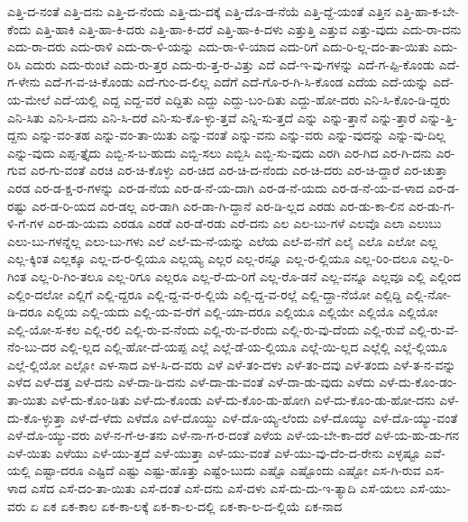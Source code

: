 {ಎತ್ತಿ-ದ-ನಂತೆ
ಎತ್ತಿ-ದನು
ಎತ್ತಿ-ದ-ನೆಂದು
ಎತ್ತಿ-ದು-ದಕ್ಕೆ
ಎತ್ತಿ-ದೊ-ಡ-ನೆಯೆ
ಎತ್ತಿ-ದ್ದೆ-ಯಂತೆ
ಎತ್ತಿನ
ಎತ್ತಿ-ಹಾ-ಕ-ಬೇ-ಕೆಂದು
ಎತ್ತಿ-ಹಾಕಿ
ಎತ್ತಿ-ಹಾ-ಕಿ-ದರು
ಎತ್ತಿ-ಹಾ-ಕಿ-ದರೆ
ಎತ್ತಿ-ಹಾ-ಕಿ-ದಳು
ಎತ್ತುತ್ತಿ
ಎತ್ತುವ
ಎತ್ತು-ವುದು
ಎದು-ರಾ-ದನು
ಎದು-ರಾ-ದರು
ಎದು-ರಾಳಿ
ಎದು-ರಾ-ಳಿ-ಯನ್ನು
ಎದು-ರಾ-ಳಿ-ಯಾದ
ಎದು-ರಿಗೆ
ಎದು-ರಿ-ಲ್ಲ-ದಂ-ತಾ-ಯಿತು
ಎದು-ರಿಸಿ
ಎದುರು
ಎದು-ರುಂಟೆ
ಎದು-ರು-ತ್ತರ
ಎದು-ರು-ತ್ತ-ರ-ವಿತ್ತು
ಎದೆ
ಎದೆ-ಇ-ವು-ಗಳನ್ನು
ಎದೆ-ಗ-ಪ್ಪಿ-ಕೊಂಡು
ಎದೆ-ಗ-ಳೇನು
ಎದೆ-ಗ-ವ-ಚಿ-ಕೊಂಡು
ಎದೆ-ಗುಂ-ದ-ಲಿಲ್ಲ
ಎದೆಗೆ
ಎದೆ-ಗೊ-ರ-ಗಿ-ಸಿ-ಕೊಂಡ
ಎದೆಯ
ಎದೆ-ಯನ್ನು
ಎದೆ-ಯ-ಮೇಲೆ
ಎದೆ-ಯಲ್ಲಿ
ಎದ್ದ
ಎದ್ದ-ವರೆ
ಎದ್ದಿತು
ಎದ್ದು
ಎದ್ದು-ಬಂ-ದಿತು
ಎದ್ದು-ಹೋ-ದರು
ಎನಿ-ಸಿ-ಕೊಂ-ಡಿ-ದ್ದರು
ಎನಿ-ಸಿತು
ಎನಿ-ಸಿ-ದನು
ಎನಿ-ಸಿ-ದರೆ
ಎನಿ-ಸು-ಕೊ-ಳ್ಳು-ತ್ತವೆ
ಎನ್ನಿ-ಸು-ತ್ತದೆ
ಎನ್ನು
ಎನ್ನು-ತ್ತಾನೆ
ಎನ್ನು-ತ್ತಾರೆ
ಎನ್ನು-ತ್ತಿ-ದ್ದನು
ಎನ್ನು-ವಂ-ತಹ
ಎನ್ನು-ವಂ-ತಾ-ಯಿತು
ಎನ್ನು-ವಂತೆ
ಎನ್ನು-ವನು
ಎನ್ನು-ವರು
ಎನ್ನು-ವುದನ್ನು
ಎನ್ನು-ವು-ದಿಲ್ಲ
ಎನ್ನು-ವುದು
ಎಪ್ಪ-ತ್ತೈದು
ಎಬ್ಬಿ-ಸ-ಬ-ಹುದು
ಎಬ್ಬಿ-ಸಲು
ಎಬ್ಬಿಸಿ
ಎಬ್ಬಿ-ಸು-ವುದು
ಎರಗಿ
ಎರ-ಗಿದ
ಎರ-ಗಿ-ದನು
ಎರ-ಗುವ
ಎರ-ಗು-ವಂತೆ
ಎರಚಿ
ಎರ-ಚಿ-ಕೊಳ್ಳು
ಎರ-ಚಿದ
ಎರ-ಚಿ-ದ-ನೆಂದು
ಎರ-ಚಿ-ದರು
ಎರ-ಚಿ-ದ್ದಾರೆ
ಎರ-ಚುತ್ತಾ
ಎರಡ
ಎರ-ಡ-ಕ್ಷ-ರ-ಗಳನ್ನು
ಎರ-ಡ-ನೆಯ
ಎರ-ಡ-ನೆ-ಯ-ದಾಗಿ
ಎರ-ಡ-ನೆ-ಯದು
ಎರ-ಡ-ನೆ-ಯ-ವ-ಳಾದ
ಎರ-ಡ-ರಷ್ಟು
ಎರ-ಡ-ರಿ-ಯದ
ಎರ-ಡಲ್ಲ
ಎರ-ಡಾಗಿ
ಎರ-ಡಾ-ಗಿ-ದ್ದಾನೆ
ಎರ-ಡಿ-ಲ್ಲದ
ಎರಡು
ಎರ-ಡು-ಕಾ-ಲಿನ
ಎರ-ಡು-ಗ-ಳಿ-ಗೆ-ಗಳ
ಎರ-ಡು-ಯಮ
ಎರಡೂ
ಎರಡೆ
ಎರ-ಡೆ-ರಡು
ಎರೆ-ದನು
ಎಲ
ಎಲ-ಬು-ಗಳೆ
ಎಲವೊ
ಎಲಾ
ಎಲುಬು
ಎಲು-ಬು-ಗಳನ್ನೆಲ್ಲ
ಎಲು-ಬು-ಗಳು
ಎಲೆ
ಎಲೆ-ಮ-ನೆ-ಯನ್ನು
ಎಲೆಯ
ಎಲೆ-ವ-ನೆಗೆ
ಎಲೈ
ಎಲೊ
ಎಲೋ
ಎಲ್ಲ
ಎಲ್ಲ-ಕ್ಕಿಂತ
ಎಲ್ಲಕ್ಕೂ
ಎಲ್ಲ-ದ-ರ-ಲ್ಲಿಯೂ
ಎಲ್ಲಯ್ಯ
ಎಲ್ಲರ
ಎಲ್ಲ-ರನ್ನೂ
ಎಲ್ಲ-ರ-ಲ್ಲಿಯೂ
ಎಲ್ಲ-ರಿಂ-ದಲೂ
ಎಲ್ಲ-ರಿ-ಗಿಂತ
ಎಲ್ಲ-ರಿ-ಗಿಂ-ತಲೂ
ಎಲ್ಲ-ರಿಗೂ
ಎಲ್ಲರೂ
ಎಲ್ಲ-ರೆ-ದು-ರಿಗೆ
ಎಲ್ಲ-ರೊ-ಡನೆ
ಎಲ್ಲ-ವನ್ನೂ
ಎಲ್ಲವೂ
ಎಲ್ಲಿ
ಎಲ್ಲಿಂದ
ಎಲ್ಲಿಂ-ದಲೋ
ಎಲ್ಲಿಗೆ
ಎಲ್ಲಿ-ದ್ದರೂ
ಎಲ್ಲಿ-ದ್ದ-ವ-ರ-ಲ್ಲಿಯೆ
ಎಲ್ಲಿ-ದ್ದ-ವ-ರಲ್ಲೆ
ಎಲ್ಲಿ-ದ್ದಾ-ನೆಯೋ
ಎಲ್ಲಿದ್ದಿ
ಎಲ್ಲಿ-ನೋ-ಡಿ-ದರೂ
ಎಲ್ಲಿಯ
ಎಲ್ಲಿ-ಯದು
ಎಲ್ಲಿ-ಯ-ವ-ರೆಗೆ
ಎಲ್ಲಿ-ಯಾ-ದರೂ
ಎಲ್ಲಿಯೂ
ಎಲ್ಲಿಯೇ
ಎಲ್ಲಿಯೊ
ಎಲ್ಲಿಯೋ
ಎಲ್ಲಿ-ಯೋ-ಸ-ಕಲ
ಎಲ್ಲಿ-ರಲಿ
ಎಲ್ಲಿ-ರು-ವ-ನೆಂದು
ಎಲ್ಲಿ-ರು-ವ-ರೆಂದು
ಎಲ್ಲಿ-ರು-ವು-ದೆಂದು
ಎಲ್ಲಿ-ರುವೆ
ಎಲ್ಲಿ-ರು-ವೆ-ನೆಂ-ಬು-ದರ
ಎಲ್ಲಿ-ಲ್ಲದ
ಎಲ್ಲಿ-ಹೋ-ದೆ-ಯಪ್ಪ
ಎಲ್ಲೆ
ಎಲ್ಲೆ-ಡೆ-ಯ-ಲ್ಲಿಯೂ
ಎಲ್ಲೆ-ಯಿ-ಲ್ಲದ
ಎಲ್ಲೆಲ್ಲಿ
ಎಲ್ಲೆ-ಲ್ಲಿಯೂ
ಎಲ್ಲೆ-ಲ್ಲಿಯೋ
ಎಲ್ಲೋ
ಎಳ-ಸಾದ
ಎಳ-ಸಿ-ದ-ವರು
ಎಳೆ
ಎಳೆ-ತಂ-ದಳು
ಎಳೆ-ತಂ-ದವು
ಎಳೆ-ತಂದು
ಎಳೆ-ತ-ನ-ವನ್ನು
ಎಳೆದ
ಎಳೆ-ದತ್ತ
ಎಳೆ-ದನು
ಎಳೆ-ದಾ-ಡಿ-ದನು
ಎಳೆ-ದಾ-ಡು-ವಂತೆ
ಎಳೆ-ದಾ-ಡು-ವುದು
ಎಳೆದು
ಎಳೆ-ದು-ಕೊಂ-ಡಂ-ತಾ-ಯಿತು
ಎಳೆ-ದು-ಕೊಂ-ಡಿತು
ಎಳೆ-ದು-ಕೊಂಡು
ಎಳೆ-ದು-ಕೊಂ-ಡು-ಹೋಗಿ
ಎಳೆ-ದು-ಕೊಂ-ಡು-ಹೋ-ದನು
ಎಳೆ-ದು-ಕೊ-ಳ್ಳುತ್ತಾ
ಎಳೆ-ದೆ-ಳೆದು
ಎಳೆದೊ
ಎಳೆ-ದೊಯ್ದು
ಎಳೆ-ದೊ-ಯ್ಯ-ಲೆಂದು
ಎಳೆ-ದೊಯ್ಯು
ಎಳೆ-ದೊ-ಯ್ಯು-ವಂತೆ
ಎಳೆ-ದೊ-ಯ್ಯು-ವರು
ಎಳೆ-ನ-ಗೆ-ಆ-ತನು
ಎಳೆ-ನಾ-ಗ-ರ-ದಂತೆ
ಎಳೆಯ
ಎಳೆ-ಯ-ಬೇ-ಕಾ-ದರೆ
ಎಳೆ-ಯ-ಹು-ಡು-ಗನ
ಎಳೆ-ಯಿತು
ಎಳೆಯು
ಎಳೆ-ಯು-ತ್ತದೆ
ಎಳೆ-ಯುತ್ತಾ
ಎಳೆ-ಯು-ವಂತೆ
ಎಳೆ-ಯು-ವು-ದೆಂ-ದ-ರೇನು
ಎಳ್ಳಷ್ಟೂ
ಎವೆ-ಯಲ್ಲಿ
ಎಷ್ಟಾ-ದರೂ
ಎಷ್ಟಿದೆ
ಎಷ್ಟು
ಎಷ್ಟು-ಹೊತ್ತು
ಎಷ್ಟೆಂ-ಬುದು
ಎಷ್ಟೊ
ಎಷ್ಟೊಂದು
ಎಷ್ಟೋ
ಎಸ-ಗಿ-ರುವ
ಎಸ-ಳಾದ
ಎಸೆದ
ಎಸೆ-ದಂ-ತಾ-ಯಿತು
ಎಸೆ-ದಂತೆ
ಎಸೆ-ದನು
ಎಸೆ-ದಳು
ಎಸೆ-ದು-ದು-ಇ-ತ್ಯಾದಿ
ಎಸೆ-ಯಲು
ಎಸೆ-ಯು-ವರು
ಏ
ಏಕ
ಏಕ-ಕಾಲ
ಏಕ-ಕಾ-ಲಕ್ಕೆ
ಏಕ-ಕಾ-ಲ-ದಲ್ಲಿ
ಏಕ-ಕಾ-ಲ-ದ-ಲ್ಲಿಯೆ
ಏಕ-ನಾದ
}
